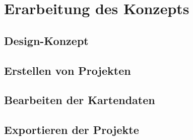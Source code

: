 \chapter{Erarbeitung des Konzepts}
\label{ch:conception}

\section{Design-Konzept}
\section{Erstellen von Projekten}
\section{Bearbeiten der Kartendaten}
\section{Exportieren der Projekte}
